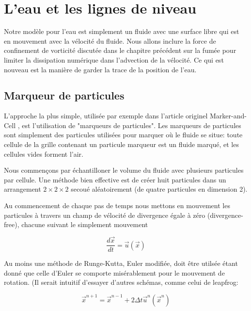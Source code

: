\documentclass[11pt]{report}
\begin{document}
\chapter{L'eau et les lignes de niveau}

Notre modèle pour l'eau est simplement un fluide avec une surface libre qui est en mouvement avec la vélocité du fluide. Nous allons inclure la force de confinement de vorticité discutée dans le chapitre précédent sur la fumée pour limiter la dissipation numérique dans l'advection de la vélocité. Ce qui est nouveau est la manière de garder la trace de la position de l'eau.

\section{Marqueur de particules} 

L'approche la plus simple, utilisée par exemple dans l'article originel Marker-and-Cell \cite{harlow-65}, est l'utilisation de "marqueurs de particules". Les marqueurs de particules sont simplement des particules utilisées pour marquer où le fluide se situe: toute cellule de la grille contenant un particule marqueur est un fluide marqué, et les cellules vides forment l'air.\newline

Nous commençons par échantilloner le volume du fluide avec plusieurs particules par cellule. Une méthode bien effective est de créer huit particules dans un arrangement $2 \times 2 \times 2$ secoué aléatoirement (de quatre particules en dimension 2).\newline

Au commencement de chaque pas de temps nous mettons en mouvement les particules à travers un champ de vélocité de divergence égale à zéro (divergence-free), chacune suivant le simplement mouvement 

\begin{equation}
\frac{d\overrightarrow{x}}{dt} = \overrightarrow{u}(\overrightarrow{x})
\end{equation}

Au moins une méthode de Runge-Kutta, Euler modifiée, doit être utilsée étant donné que celle d'Euler se comporte misérablement pour le mouvement de rotation. (Il serait intuitif d'essayer d'autres schémas, comme celui de leapfrog:

\begin{equation}
\overrightarrow{x}^{n+1} = \overrightarrow{x}^{n-1} + 2 \Delta t \overrightarrow{u}^n(\overrightarrow{x}^n)
\end{equation}
\end{document}
